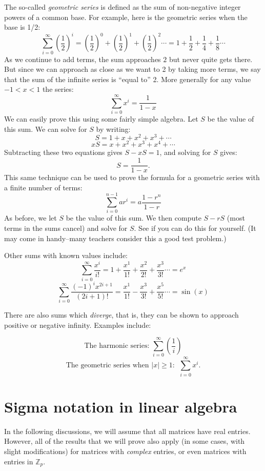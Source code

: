The so-called \emph{geometric series} is defined as the sum of non-negative integer powers of a common base.  For example, here is the geometric series when the base is 1/2:
\[\sum_{i=0}^{\infty}\left({\dfrac{1}{2}}\right)^i=\left({\dfrac{1}{2}}\right)^0+\left({\dfrac{1}{2}}\right)^1+\left({\dfrac{1}{2}}\right)^2\cdots = 1 + {\dfrac{1}{2}} + {\dfrac{1}{4}} + {\dfrac{1}{8}}\cdots\]
As we continue to add  terms,  the sum approaches $2$ but never quite gets there. But since we can approach as close as we want to 2 by taking more terms, we say that the sum of the infinite series is ``equal to'' 2. 
More generally for any value $-1<x<1$ the series:
\[\sum_{i=0}^{\infty}x^i = \dfrac{1}{1-x}\]
We can easily prove this using some fairly simple algebra.  Let $S$ be the value of this sum.  We can solve for $S$  by writing:
 \[S=1+x+x^2+x^3+ \cdots \]
\[xS=x+x^2+x^3+x^4+ \cdots \] 
Subtracting these two equations gives $S-xS=1$, and solving for $S$ gives:
\[S=\dfrac{1}{1-x}. \]
This same technique can be used to prove the formula for a geometric series with a finite number of terms:
\[ \sum_{i=0}^{n-1} ar^i = a \dfrac{1-r^n}{1-r} \]
As before, we let $S$ be the value of this sum. We then compute $S - rS$ (most terms in the sums cancel) and solve for $S$.  See if you can do this for yourself.  (It may come in handy--many teachers consider this a good test problem.)

Other sums with known values include:
\[\sum_{i=0}^{\infty}\dfrac{x^i}{i!} =1+\dfrac{x^1}{1!}+\dfrac{x^2}{2!}+\dfrac{x^3}{3!} \cdots=e^x\]
\[\sum_{i=0}^{\infty}\dfrac{(-1)^i x^{2i+1}}{(2i+1)!} = \dfrac{x^1}{1!}-\dfrac{x^3}{3!}+\dfrac{x^5}{5!}\cdots= \sin(x)\]

There are also sums which \emph{diverge}, that is, they can be shown to approach positive or negative infinity. Examples include:

\[\text{The harmonic series:  }\sum_{i=0}^{\infty}\left(\dfrac{1}{i} \right) \]
\[\text{The geometric series when~} |x| \ge 1: ~~\sum_{i=0}^{\infty} x^i. \]

\section{Sigma notation in linear algebra\quad
{}}\label{sec:sigmaLinAlg}

In the following discussions, we will assume that all matrices have real entries.  However, all of the results that we will prove also apply (in some cases, with slight modifications)  for matrices with \emph{complex} entries, or even matrices with entries in $\mathbb{Z}_p$.

